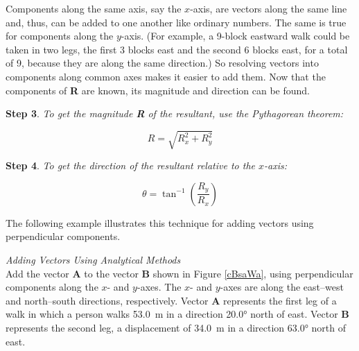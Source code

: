 \documentclass[../../main-ap-physics.tex]{subfiles}
\begin{document}
\begin{center}
    \captionsetup{type=figure,margin=1in,font=scriptsize}
    \label{QVly9l}
\end{center}

Components along the same axis, say the $x$-axis, are vectors along the same line and, thus, can be added to one another like ordinary numbers. The same is true for components along the $y$-axis. (For example, a 9-block eastward walk could be taken in two legs, the first 3 blocks east and the second 6 blocks east, for a total of 9, because they are along the same direction.) So resolving vectors into components along common axes makes it easier to add them. Now that the components of \textbf{R} are known, its magnitude and direction can be found.

\vspace{1em}

\textbf{Step 3}. \textit{To get the magnitude \textbf{R} of the resultant, use the Pythagorean theorem:}

\begin{equation}
    R = \sqrt{R_x^2 + R_y^2}
\end{equation}

\textbf{Step 4}. \textit{To get the direction of the resultant relative to the $x$-axis:}

\begin{equation}
    \theta = \tan^{-1}\left(\frac{R_y}{R_x}\right)
\end{equation}

The following example illustrates this technique for adding vectors using perpendicular components.

\begin{example}
    \textit{Adding Vectors Using Analytical Methods}\\
    Add the vector \textbf{A} to the vector \textbf{B} shown in Figure \ref{cBsaWa}, using perpendicular components along the $x$- and $y$-axes. The $x$- and $y$-axes are along the east–west and north–south directions, respectively. Vector \textbf{A} represents the first leg of a walk in which a person walks \SI{53.0}{m} in a direction \ang{20.0} north of east. Vector \textbf{B} represents the second leg, a displacement of \SI{34.0}{m} in a direction \ang{63.0} north of east.
\end{example}
\end{document}
